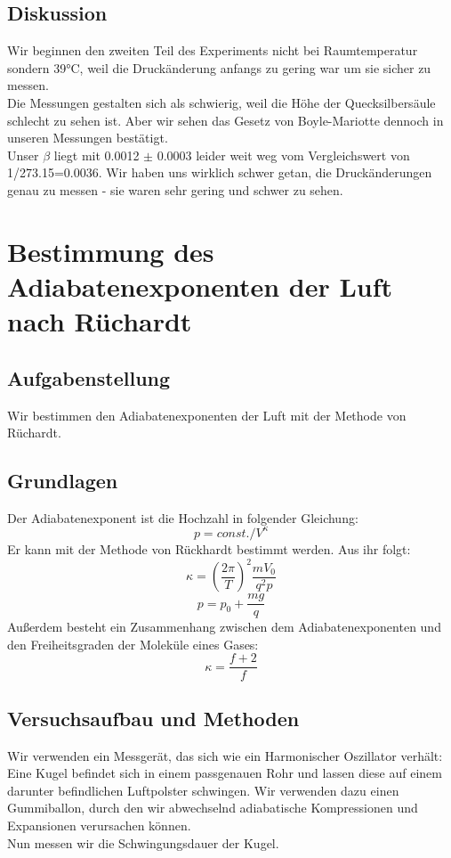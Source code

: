 \documentclass{article}
\begin{document}
\subsection{Diskussion}
Wir beginnen den zweiten Teil des Experiments nicht bei Raumtemperatur sondern 39°C, weil die Druckänderung anfangs zu gering war um sie sicher zu messen. \\
Die Messungen gestalten sich als schwierig, weil die Höhe der Quecksilbersäule schlecht zu sehen ist. Aber wir sehen das Gesetz von Boyle-Mariotte dennoch in unseren Messungen bestätigt. \\
Unser $\beta$ liegt mit 0.0012 $\pm$ 0.0003 leider weit weg vom Vergleichswert von 1/273.15=0.0036. Wir haben uns wirklich schwer getan, die Druckänderungen genau zu messen - sie waren sehr gering und schwer zu sehen. 

\newpage
\section{Bestimmung des Adiabatenexponenten der Luft nach Rüchardt}
\subsection{Aufgabenstellung}
Wir bestimmen den Adiabatenexponenten der Luft mit der Methode von Rüchardt.
\subsection{Grundlagen}
Der Adiabatenexponent ist die Hochzahl in folgender Gleichung:\\
$$p=const./V^{\kappa}$$
Er kann mit der Methode von Rückhardt bestimmt werden. Aus ihr folgt:
\begin{equation}
\label{kappa}
\kappa=(\frac{2\pi}{T})^2 \frac{mV_0}{q^2p}
\end{equation}
$$p=p_0+\frac{mg}{q}$$
Außerdem besteht ein Zusammenhang zwischen dem Adiabatenexponenten und den Freiheitsgraden der Moleküle eines Gases:
$$\kappa=\frac{f+2}{f}$$
\subsection{Versuchsaufbau und Methoden}
Wir verwenden ein Messgerät, das sich wie ein Harmonischer Oszillator verhält: Eine Kugel befindet sich in einem passgenauen Rohr und lassen diese auf einem darunter befindlichen Luftpolster schwingen. Wir verwenden dazu einen Gummiballon, durch den wir abwechselnd adiabatische Kompressionen und Expansionen verursachen können.\\
Nun messen wir die Schwingungsdauer der Kugel. 
\end{document}
